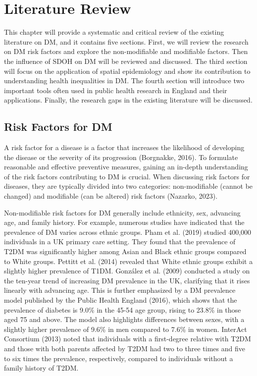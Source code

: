 \chapter{Literature Review}
\label{chap:2}

This chapter will provide a systematic and critical review of the existing literature on DM, and it contains five sections. First, we will review the research on DM risk factors and explore the non-modifiable and modifiable factors. Then the influence of SDOH on DM will be reviewed and discussed. The third section will focus on the application of spatial epidemiology and show its contribution to understanding health inequalities in DM. The fourth section will introduce two important tools often used in public health research in England and their applications. Finally, the research gaps in the existing literature will be discussed.

\section{Risk Factors for DM}
\label{sec:2.1}
A risk factor for a disease is a factor that increases the likelihood of developing the disease or the severity of its progression (Borgnakke, 2016). To formulate reasonable and effective preventive measures, gaining an in-depth understanding of the risk factors contributing to DM is crucial. When discussing risk factors for diseases, they are typically divided into two categories: non-modifiable (cannot be changed) and modifiable (can be altered) risk factors (Nazarko, 2023).

Non-modifiable risk factors for DM generally include ethnicity, sex, advancing age, and family history. For example, numerous studies have indicated that the prevalence of DM varies across ethnic groups. Pham et al. (2019) studied 400,000 individuals in a UK primary care setting. They found that the prevalence of T2DM was significantly higher among Asian and Black ethnic groups compared to White groups. Pettitt et al. (2014) revealed that White ethnic groups exhibit a slightly higher prevalence of T1DM. González et al. (2009) conducted a study on the ten-year trend of increasing DM prevalence in the UK, clarifying that it rises linearly with advancing age. This is further emphasized by a DM prevalence model published by the Public Health England (2016), which shows that the prevalence of diabetes is 9.0\% in the 45-54 age group, rising to 23.8\% in those aged 75 and above. The model also highlights differences between sexes, with a slightly higher prevalence of 9.6\% in men compared to 7.6\% in women. InterAct Consortium (2013) noted that individuals with a first-degree relative with T2DM and those with both parents affected by T2DM had two to three times and five to six times the prevalence, respectively, compared to individuals without a family history of T2DM.

